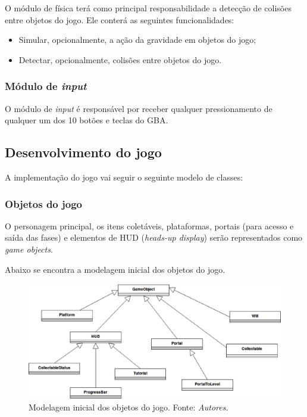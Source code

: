       O módulo de física terá como principal responsabilidade a detecção de colisões entre objetos do jogo. Ele conterá as seguintes funcionalidades:

      \begin{itemize}
        \item Simular, opcionalmente, a ação da gravidade em objetos do jogo;
        \item Detectar, opcionalmente, colisões entre objetos do jogo.
      \end{itemize}

    \subsubsection{Módulo de \textit{input}}

      O módulo de \textit{input} é responsável por receber qualquer pressionamento de qualquer um dos 10 botões e teclas do GBA.

  \subsection{Desenvolvimento do jogo}

    A implementação do jogo vai seguir o seguinte modelo de classes:

    \subsubsection{Objetos do jogo}

      O personagem principal, os itens coletáveis, plataformas, portais (para acesso e saída das fases) e elementos de HUD (\textit{heads-up display}) serão representados como \textit{game objects}.

      Abaixo se encontra a modelagem inicial dos objetos do jogo.

      \begin{figure}[H]
        \centering \includegraphics[keepaspectratio=true,scale=0.6]{figuras/class-diagram-1.eps}
        \caption[Modelagem inicial dos objetos do jogo]
          {Modelagem inicial dos objetos do jogo. Fonte: \textit{Autores}.}
        \label{game-object-children}
      \end{figure}

